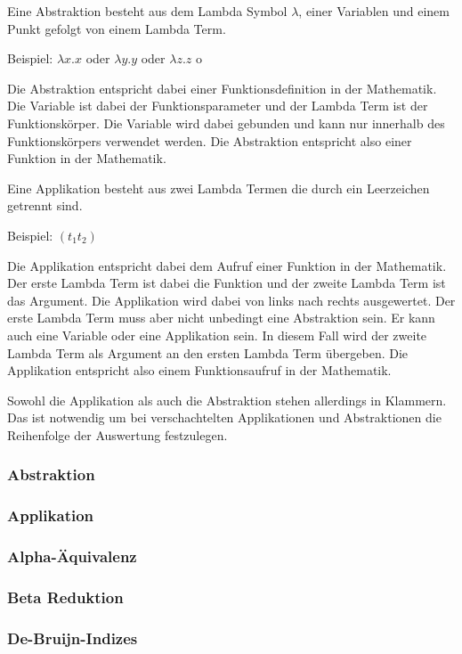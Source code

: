\documentclass{article}
\begin{document}
Eine Abstraktion besteht aus dem Lambda Symbol $\lambda$, einer Variablen und einem Punkt gefolgt von einem Lambda Term. 

Beispiel: $\lambda x.x$ oder $\lambda y.y$ oder $\lambda z.z$ o

Die Abstraktion entspricht dabei einer Funktionsdefinition in der Mathematik. Die Variable ist dabei der Funktionsparameter und der Lambda Term ist der Funktionskörper. Die Variable wird dabei gebunden und kann nur innerhalb des Funktionskörpers verwendet werden. Die Abstraktion entspricht also einer Funktion in der Mathematik.

Eine Applikation besteht aus zwei Lambda Termen die durch ein Leerzeichen getrennt sind. 

Beispiel: $(t_1 t_2)$ 

Die Applikation entspricht dabei dem Aufruf einer Funktion in der Mathematik. Der erste Lambda Term ist dabei die Funktion und der zweite Lambda Term ist das Argument. Die Applikation wird dabei von links nach rechts ausgewertet. Der erste Lambda Term muss aber nicht unbedingt eine Abstraktion sein. Er kann auch eine Variable oder eine Applikation sein. In diesem Fall wird der zweite Lambda Term als Argument an den ersten Lambda Term übergeben. Die Applikation entspricht also einem Funktionsaufruf in der Mathematik.

Sowohl die Applikation als auch die Abstraktion stehen allerdings in Klammern. Das ist notwendig um bei verschachtelten Applikationen und Abstraktionen die Reihenfolge der Auswertung festzulegen.

\subsubsection{Abstraktion}

\subsubsection{Applikation}

\subsubsection{Alpha-Äquivalenz}

\subsubsection{Beta Reduktion}

\subsubsection{De-Bruijn-Indizes}
\end{document}
